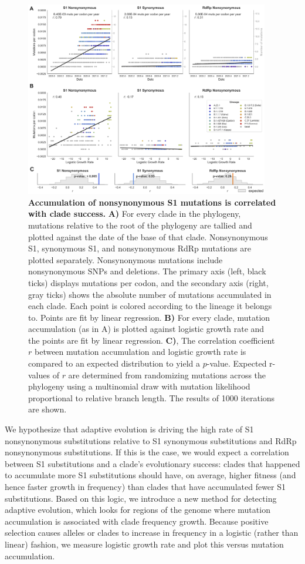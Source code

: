 \documentclass[11pt,oneside,letterpaper]{article}
\begin{document}
\begin{figure}[h!]
	\centerline{\includegraphics[width=0.95\textwidth]{fig1_mutaccumulation.png}}
	\caption{\textbf{Accumulation of nonsynonymous S1 mutations is correlated with clade success.}
	\textbf{A)} For every clade in the phylogeny, mutations relative to the root of the phylogeny are tallied and plotted against the date of the base of that clade. Nonsynonymous S1, synonymous S1, and nonsynonymous RdRp mutations are plotted separately. Nonsynonymous mutations include nonsynonymous SNPs and deletions. The primary axis (left, black ticks) displays mutations per codon, and the secondary axis (right, gray ticks) shows the absolute number of mutations accumulated in each clade. Each point is colored according to the lineage it belongs to. Points are fit by linear regression. \textbf{B)} For every clade, mutation accumulation (as in A) is plotted against logistic growth rate and the points are fit by linear regression. \textbf{C)}, The correlation coefficient $r$ between mutation accumulation and logistic growth rate is compared to an expected distribution to yield a $p$-value. Expected r-values of $r$ are determined from randomizing mutations across the phylogeny using a multinomial draw with mutation likelihood proportional to relative branch length. The results of 1000 iterations are shown.
	}
	\label{fig:mutaccumulation}
\end{figure}

We hypothesize that adaptive evolution is driving the high rate of S1 nonsynonymous substitutions relative to S1 synonymous substitutions and RdRp nonsynonymous substitutions. 
If this is the case, we would expect a correlation between S1 substitutions and a clade’s evolutionary success: clades that happened to accumulate more S1 substitutions should have, on average, higher fitness (and hence faster growth in frequency) than clades that have accumulated fewer S1 substitutions. 
Based on this logic, we introduce a new method for detecting adaptive evolution, which looks for regions of the genome where mutation accumulation is associated with clade frequency growth. 
Because positive selection causes alleles or clades to increase in frequency in a logistic (rather than linear) fashion, we measure logistic growth rate and plot this versus mutation accumulation.
\end{document}
